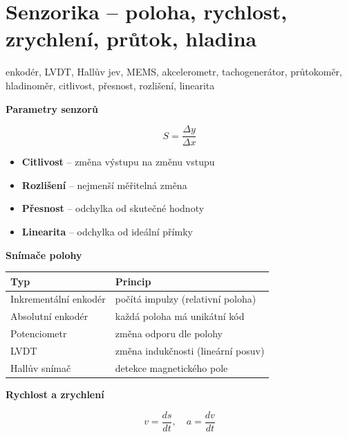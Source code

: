 \documentclass[a4paper,10pt]{article}
\begin{document}
\section{Senzorika -- poloha, rychlost, zrychlení, průtok, hladina}

\begin{pojmybox}
enkodér, LVDT, Hallův jev, MEMS, akcelerometr,
tachogenerátor, průtokoměr, hladinoměr,
citlivost, přesnost, rozlišení, linearita
\end{pojmybox}

\begin{vysvetlenibox}

\textbf{Parametry senzorů}

\begin{vzorcebox}
\[
S = \frac{\Delta y}{\Delta x}
\]
\end{vzorcebox}

\begin{itemize}
\item \textbf{Citlivost} – změna výstupu na změnu vstupu
\item \textbf{Rozlišení} – nejmenší měřitelná změna
\item \textbf{Přesnost} – odchylka od skutečné hodnoty
\item \textbf{Linearita} – odchylka od ideální přímky
\end{itemize}

\textbf{Snímače polohy}

\begin{tabularx}{\linewidth}{l X}
\toprule
Typ & Princip \\
\midrule
Inkrementální enkodér & počítá impulzy (relativní poloha) \\
Absolutní enkodér & každá poloha má unikátní kód \\
Potenciometr & změna odporu dle polohy \\
LVDT & změna indukčnosti (lineární posuv) \\
Hallův snímač & detekce magnetického pole \\
\bottomrule
\end{tabularx}

\textbf{Rychlost a zrychlení}

\begin{vzorcebox}
\[
v = \frac{ds}{dt}, \quad a = \frac{dv}{dt}
\]
\end{vzorcebox}


\end{vysvetlenibox}
\end{document}
